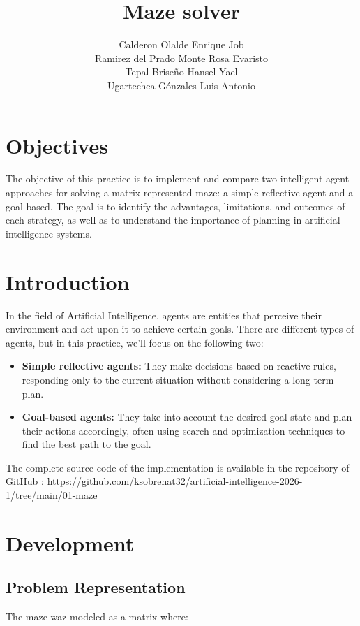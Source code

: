 \documentclass[letterpaper,12pt,oneside]{article}
\author{Calderon Olalde Enrique Job \\
Ramirez del Prado Monte Rosa Evaristo \\
Tepal Briseño Hansel Yael \\
Ugartechea Gónzales Luis Antonio
}
\title{Maze solver}
\begin{document}
\maketitle

\section{Objectives}

The objective of this practice is to implement and compare two intelligent agent approaches for solving a matrix-represented maze: a simple reflective agent and a goal-based. The goal is to identify the advantages, limitations, and outcomes of each strategy, as well as to understand the importance of planning in artificial intelligence systems.

\section{Introduction}

In the field of Artificial Intelligence, agents are entities that perceive their environment and act upon it to achieve certain goals. There are different types of agents, but in this practice, we'll focus on the following two:

\begin{itemize}
    \item \textbf{Simple reflective agents:} They make decisions based on reactive rules, responding only to the current situation without considering a long-term plan.
    \item \textbf{Goal-based agents:} They take into account the desired goal state and plan their actions accordingly, often using search and optimization techniques to find the best path to the goal.
\end{itemize}

The complete source code of the implementation is available in the repository of GitHub : \url{https://github.com/ksobrenat32/artificial-intelligence-2026-1/tree/main/01-maze}
\section{Development}

\subsection{Problem Representation}

The maze waz modeled as a matrix where:
\end{document}
